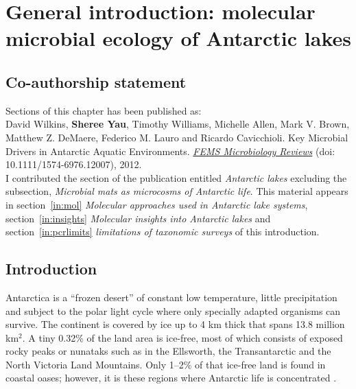 \chapter[General introduction]{General introduction: molecular microbial ecology of Antarctic lakes}
\label{ch:intro}


\section*{Co-authorship statement}

Sections of this chapter has been published as:\\

David Wilkins, \textbf{Sheree Yau}, Timothy Williams, Michelle Allen, Mark V. Brown, Matthew Z. DeMaere, Federico M. Lauro and Ricardo Cavicchioli. 
Key Microbial Drivers in Antarctic Aquatic Environments.
\textit{\underline{FEMS Microbiology Reviews}} 
(doi: 10.1111/1574-6976.12007), 2012.\\

I contributed the section of the publication entitled \emph{Antarctic lakes} excluding the subsection, \emph{Microbial mats as microcosms of Antarctic life}.
This material appears in section~\ref{in:mol} \emph{Molecular approaches used in Antarctic lake systems}, section~\ref{in:insights} \emph{Molecular insights into Antarctic lakes} and section~\ref{in:pcrlimits} \emph{limitations of taxonomic surveys} of this introduction.
\newpage


\section{Introduction}
Antarctica is a ``frozen desert'' of constant low temperature, little precipitation and subject to the polar light cycle where only specially adapted organisms can survive.
The continent is covered by ice up to 4 km thick that spans 13.8 million km$^2$.
A tiny 0.32\% of the land area is ice-free, most of which consists of exposed rocky peaks or nunataks such as in the Ellsworth, the Transantarctic and the North Victoria Land Mountains. %
Only 1--2\% of that ice-free land is found in coastal oases; however, it is these regions where Antarctic life is concentrated \cite{Hodgson2012}.

